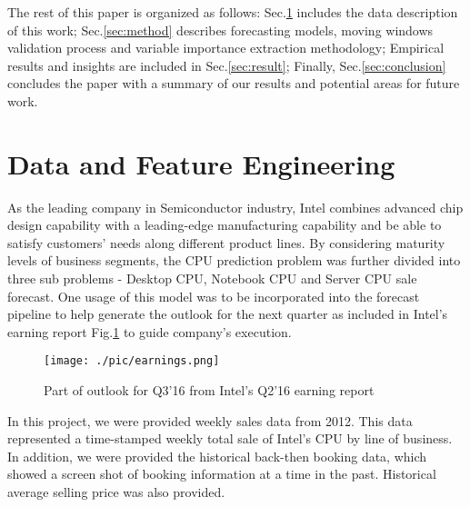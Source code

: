 \documentclass{llncs}
\begin{document}
The rest of this paper is organized as follows: Sec.\ref{sec:data} includes the data description of this work; Sec.\ref{sec:method} describes forecasting models, moving windows validation process and variable importance extraction methodology; Empirical results and insights are included in Sec.\ref{sec:result}; Finally, Sec.\ref{sec:conclusion} concludes the paper with a summary of our results and potential areas for future work.

\section{Data and Feature Engineering}
\label{sec:data}
As the leading company in Semiconductor industry, Intel combines advanced chip design capability with a leading-edge manufacturing capability and be able to satisfy customers' needs along different product lines. By considering maturity levels of business segments, the CPU prediction problem was further divided into three sub problems - Desktop CPU, Notebook CPU and Server CPU sale forecast. One usage of this model was to be incorporated into the forecast pipeline to help generate the outlook for the next quarter as included in Intel's earning report Fig.\ref{fig:variable1} to guide company's execution. 

\begin{figure}[ht]
	\centering 
    \texttt{[image: ./pic/earnings.png]}
    \caption{Part of outlook for Q3'16 from Intel's Q2'16 earning report}
    \label{fig:variable1}
\end{figure}

In this project, we were provided weekly sales data from 2012. This data represented a time-stamped weekly total sale of Intel's CPU by line of business. In addition, we were provided the historical back-then booking data, which showed a screen shot of booking information at a time in the past. Historical average selling price was also provided.
\end{document}

